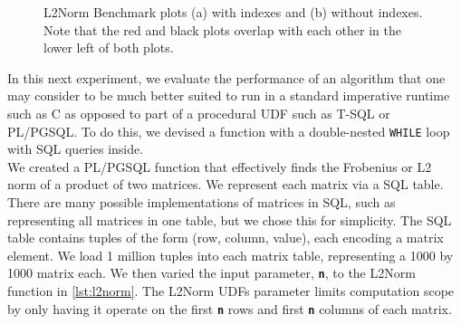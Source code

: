 \documentclass[12pt]{cmuthesis}
\newcommand{\dbSQL}[1]{\texttt{\textbf{#1}}\xspace}
\begin{document}
\begin{figure}[!h]

    
 \caption{L2Norm Benchmark plots (a) with indexes and (b) without indexes. Note that the red and black plots overlap with each other in the lower left of both plots.}
 \label{fig:L2fig}
\end{figure}


    
    In this next experiment, we evaluate the performance of an algorithm that one may consider to be much better suited to run in a standard imperative runtime such as C as opposed to part of a procedural UDF such as T-SQL or PL/PGSQL. To do this, we devised a function with a double-nested \texttt{WHILE} loop with SQL queries inside.\\ 
    
    We created a PL/PGSQL function that effectively finds the Frobenius or L2 norm of a product of two matrices. We represent each matrix via a SQL table. There are many possible implementations of matrices in SQL, such as representing all matrices in one table, but we chose this for simplicity. The SQL table contains tuples of the form (row, column, value), each encoding a matrix element. We load 1 million tuples into each matrix table, representing a 1000 by 1000 matrix each. We then varied the input parameter, \dbSQL{n}, to the L2Norm function in \cref{lst:l2norm}. The L2Norm UDFs parameter limits computation scope by only having it operate on the first \dbSQL{n} rows and first \dbSQL{n} columns of each matrix.\\
\end{document}
